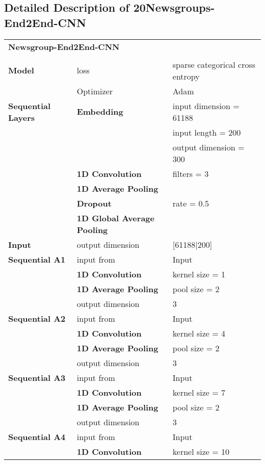 \begin{appendices}
\chapter{Detailed Description of 20Newsgroups-End2End-CNN}
\begin{tabularx}{\textwidth}[!h]{X X X}
	\multicolumn{3}{X}{\textbf{Newsgroup-End2End-CNN}}\\
	\\
	\hline
	\endhead
	\textbf{Model} & loss & sparse categorical cross entropy\\
	& Optimizer & Adam\\
	\hline
	\textbf{Sequential Layers} & \textbf{Embedding} & input dimension = 61188\\
	& & input length = 200\\
	& & output dimension = 300\\
	& \textbf{1D Convolution} & filters = 3\\
	& \textbf{1D Average Pooling} &\\
	& \textbf{Dropout} & rate = 0.5\\
	& \textbf{1D Global Average Pooling} &\\
	\hline
	\textbf{Input} & output dimension & [61188|200]\\
	[8pt]
	\textbf{Sequential A1} & input from & Input\\
	& \textbf{1D Convolution} & kernel size = 1\\
	& \textbf{1D Average Pooling} & pool size = 2\\
	& output dimension & 3\\
	[8pt]
	\textbf{Sequential A2} & input from & Input\\
	& \textbf{1D Convolution} & kernel size = 4\\
	& \textbf{1D Average Pooling} & pool size = 2\\
	& output dimension & 3\\
	[8pt]
	\textbf{Sequential A3} & input from & Input\\
	& \textbf{1D Convolution} & kernel size = 7\\
	& \textbf{1D Average Pooling} & pool size = 2\\
	& output dimension & 3\\
	[8pt]
	\textbf{Sequential A4} & input from & Input\\
	& \textbf{1D Convolution} & kernel size = 10\\

\end{tabularx}
\end{appendices}
